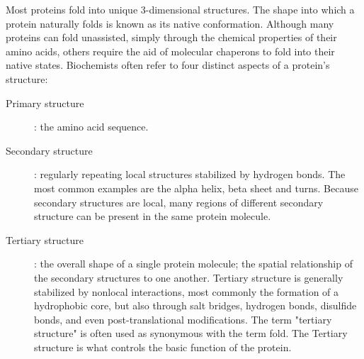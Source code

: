 \documentclass[a4paper,12pt,english]{report}
\begin{document}
Most proteins fold into unique 3-dimensional structures. The shape into which a protein naturally folds is known as its native conformation. Although many proteins can fold unassisted, simply through the chemical properties of their amino acids, others require the aid of molecular chaperons to fold into their native states. Biochemists often refer to four distinct aspects of a protein's structure:

\begin{description}
\item[Primary structure]: the amino acid sequence.
\item[Secondary structure]: regularly repeating local structures stabilized by hydrogen bonds. The most common examples are the alpha helix, beta sheet and turns. Because secondary structures are local, many regions of different secondary structure can be present in the same protein molecule.
\item[Tertiary structure]: the overall shape of a single protein molecule; the spatial relationship of the secondary structures to one another. Tertiary structure is generally stabilized by nonlocal interactions, most commonly the formation of a hydrophobic core, but also through salt bridges, hydrogen bonds, disulfide bonds, and even post-translational modifications. The term "tertiary structure" is often used as synonymous with the term fold. The Tertiary structure is what controls the basic function of the protein.
\end{description}
\vspace{2.5cm} %
\end{document}
